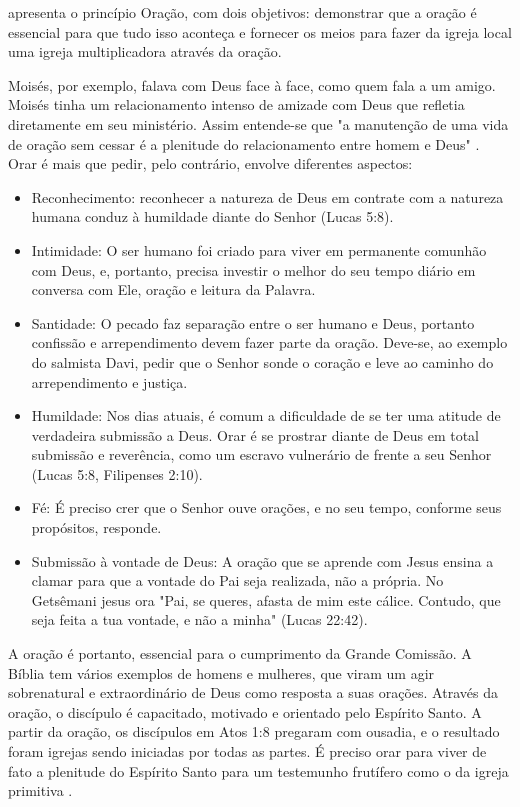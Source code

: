 \documentclass[12pt,openright,oneside,a4paper]{abntex2}
\begin{document}
\begin{citacao}apresenta o princípio Oração, com dois objetivos: demonstrar que a oração é essencial para que tudo isso aconteça e fornecer os meios para fazer da igreja local uma igreja multiplicadora através da oração\cite[p. 29]{brandao}. \end{citacao}

Moisés, por exemplo, falava com Deus face à face, como quem fala a um amigo. Moisés tinha um relacionamento intenso de amizade com Deus que refletia diretamente em seu ministério. Assim entende-se que "a manutenção de uma vida de oração sem cessar é a plenitude do relacionamento entre homem e Deus" \cite[p. 30]{brandao}. Orar é mais que pedir, pelo contrário, envolve diferentes aspectos:

\begin{itemize}
	\item Reconhecimento: reconhecer a natureza de Deus em contrate com a natureza humana conduz à humildade diante do Senhor (Lucas 5:8).
	\item Intimidade: O ser humano foi criado para viver em permanente comunhão com Deus, e, portanto, precisa investir o melhor do seu tempo diário em conversa com Ele, oração e leitura da Palavra.
	\item Santidade: O pecado faz separação entre o ser humano e Deus, portanto confissão e arrependimento devem fazer parte da oração. Deve-se, ao exemplo do salmista Davi, pedir que o Senhor sonde o coração e leve ao caminho do arrependimento e justiça.
	\item Humildade: Nos dias atuais, é comum a dificuldade de se ter uma atitude de verdadeira submissão a Deus. Orar é se prostrar diante de Deus em total submissão e reverência, como um escravo vulnerário de frente a seu Senhor (Lucas 5:8, Filipenses 2:10).
	\item Fé: É preciso crer que o Senhor ouve orações, e no seu tempo, conforme seus propósitos, responde.
	\item Submissão à vontade de Deus: A oração que se aprende com Jesus ensina a clamar para que a vontade do Pai seja realizada, não a própria. No Getsêmani jesus ora "Pai, se queres, afasta de mim este cálice. Contudo, que seja feita a tua vontade, e não a minha" (Lucas 22:42).

	\cite[p. 30,31]{brandao}  
\end{itemize}

  A oração é portanto, essencial para o cumprimento da Grande Comissão. A Bíblia tem vários exemplos de homens e mulheres, que viram um agir sobrenatural e extraordinário de Deus como resposta a suas orações. Através da oração, o discípulo é capacitado, motivado e orientado pelo Espírito Santo. A partir da oração, os discípulos em Atos 1:8 pregaram com ousadia, e o resultado foram igrejas sendo iniciadas por todas as partes. É preciso orar para viver de fato a plenitude do Espírito Santo para um testemunho frutífero como o da igreja primitiva \cite[p. 32]{brandao}.
\end{document}
